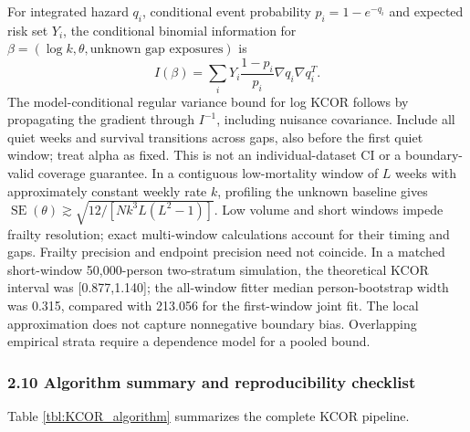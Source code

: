 \documentclass[
]{article}
\begin{document}
For integrated hazard \(q_i\), conditional event probability \(p_i=1-e^{-q_i}\) and expected risk set \(Y_i\), the conditional binomial information for \(\beta=(\log k,\theta,\text{unknown gap exposures})\) is \[I(\beta)=\sum_i Y_i\frac{1-p_i}{p_i}\nabla q_i\nabla q_i^T.\] The model-conditional regular variance bound for log KCOR follows by propagating the gradient through \(I^{-1}\), including nuisance covariance. Include all quiet weeks and survival transitions across gaps, also before the first quiet window; treat alpha as fixed. This is not an individual-dataset CI or a boundary-valid coverage guarantee. In a contiguous low-mortality window of \(L\) weeks with approximately constant weekly rate \(k\), profiling the unknown baseline gives \(\operatorname{SE}(\theta)\gtrsim\sqrt{12/[Nk^3 L(L^2-1)]}\). Low volume and short windows impede frailty resolution; exact multi-window calculations account for their timing and gaps. Frailty precision and endpoint precision need not coincide. In a matched short-window 50,000-person two-stratum simulation, the theoretical KCOR interval was {[}0.877,1.140{]}; the all-window fitter median person-bootstrap width was 0.315, compared with 213.056 for the first-window joint fit. The local approximation does not capture nonnegative boundary bias. Overlapping empirical strata require a dependence model for a pooled bound.

\subsubsection{2.10 Algorithm summary and reproducibility checklist}\label{algorithm-summary-and-reproducibility-checklist}

Table \ref{tbl:KCOR_algorithm} summarizes the complete KCOR pipeline.
\end{document}
